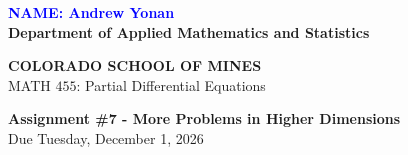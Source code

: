 \documentclass[12pt]{article}
\begin{document}
\begin{flushleft}


\textcolor{blue}{\textbf{NAME: Andrew Yonan}}\\
\textbf{Department of Applied Mathematics and Statistics}

\textbf{COLORADO SCHOOL OF MINES}\\


MATH $455$: Partial Differential Equations
\end{flushleft}

\vspace{0.1in}

\begin{center}
{\bf Assignment \#7 - More Problems in Higher Dimensions} \\
Due Tuesday, December 1, 2026 \\
\end{center}

\vspace{0.3in}
\end{document}
